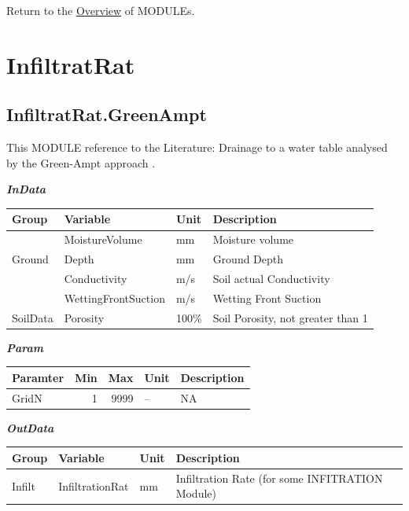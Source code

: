 \documentclass[
]{book}
\begin{document}
Return to the \protect\hyperlink{module}{Overview} of MODULEs.

\hypertarget{InfiltratRat}{%
\section{InfiltratRat}\label{InfiltratRat}}

\hypertarget{InfiltratRat.GreenAmpt}{%
\subsection{InfiltratRat.GreenAmpt}\label{InfiltratRat.GreenAmpt}}

This MODULE reference to the Literature: Drainage to a water table analysed by the Green-Ampt approach \citep{Youngs.1976}.

\textbf{\emph{InData}}

\begin{table}[!h]
\centering
\begin{tabular}{l|l|l|l}
\hline
Group & Variable & Unit & Description\\
\hline
 & MoistureVolume & mm & Moisture volume\\
\cline{2-4}
\multirow{-2}{*}{\raggedright\arraybackslash Ground} & Depth & mm & Ground Depth\\
\cline{1-4}
 & Conductivity & m/s & Soil actual Conductivity\\
\cline{2-4}
 & WettingFrontSuction & m/s & Wetting Front Suction\\
\cline{2-4}
\multirow{-3}{*}{\raggedright\arraybackslash SoilData} & Porosity & 100\% & Soil Porosity, not greater than 1\\
\hline
\end{tabular}
\end{table}

\textbf{\emph{Param}}

\begin{table}[!h]
\centering
\begin{tabular}{l|r|r|l|l}
\hline
Paramter & Min & Max & Unit & Description\\
\hline
GridN & 1 & 9999 & -- & NA\\
\hline
\end{tabular}
\end{table}

\textbf{\emph{OutData}}

\begin{table}[!h]
\centering
\begin{tabular}{l|l|l|l}
\hline
Group & Variable & Unit & Description\\
\hline
Infilt & InfiltrationRat & mm & Infiltration Rate (for some INFITRATION Module)\\
\hline
\end{tabular}
\end{table}
\end{document}
